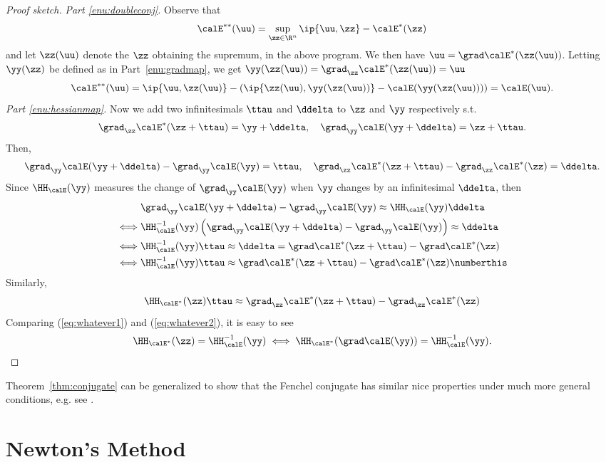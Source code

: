 \begin{proof}[Proof sketch]
\emph{Part \ref{enu:doubleconj}.}
  Observe that
  \[ \calE^{**}(\uu) = \sup_{\zz \in \R^n} \ip{\uu,\zz} - \calE^*(\zz) \]
  and let $\zz(\uu)$ denote the $\zz$ obtaining the supremum, in the
  above program.
  We then have ${\uu =\grad\calE^*(\zz(\uu))}$. Letting $\yy(\zz)$ be
  defined as in Part~\ref{enu:gradmap},
  we get $\yy(\zz(\uu)) = \grad_{\zz}\calE^*(\zz(\uu)) = \uu$
  \[
    \calE^{**}(\uu) = \ip{\uu,\zz(\uu)} - \left(
      \ip{\zz(\uu),\yy(\zz(\uu))}-\calE(\yy(\zz(\uu))) \right)
    = \calE(\uu)
  .
  \]
  \emph{Part \ref{enu:hessianmap}.}
  Now we add two infinitesimals $\ttau$ and $\ddelta$ to $\zz$ and $\yy$ respectively s.t.
  \[ \grad_{\zz}\calE^*(\zz+\ttau)=\yy+\ddelta, \quad \grad_{\yy}\calE(\yy+\ddelta) = \zz+\ttau. \]
  Then,
  \[ \grad_{\yy}\calE(\yy+\ddelta) - \grad_{\yy}\calE(\yy) = \ttau, \quad
  \grad_{\zz}\calE^*(\zz+\ttau) - \grad_{\zz}\calE^*(\zz) = \ddelta. \]
  Since $\HH_{\calE}(\yy)$ measures the change of $\grad_{\yy}\calE(\yy)$ when $\yy$ changes by an infinitesimal $\ddelta$, then
  \begin{align*}
    & \grad_{\yy}\calE(\yy+\ddelta) - \grad_{\yy}\calE(\yy) \approx \HH_{\calE}(\yy)\ddelta \\
    \iff & \HH_{\calE}^{-1}(\yy)\left( \grad_{\yy}\calE(\yy+\ddelta) - \grad_{\yy}\calE(\yy) \right) \approx \ddelta \\
    \iff & \HH_{\calE}^{-1}(\yy)\ttau \approx \ddelta = \grad\calE^*(\zz+\ttau) - \grad\calE^*(\zz) \\
    \iff & \HH_{\calE}^{-1}(\yy)\ttau \approx \grad\calE^*(\zz+\ttau) - \grad\calE^*(\zz) \numberthis \label{eq:whatever1}
  \end{align*}
  Similarly,
  \begin{equation}\label{eq:whatever2}
    \HH_{\calE^*}(\zz)\ttau \approx
    \grad_{\zz}\calE^*(\zz+\ttau) - \grad_{\zz}\calE^*(\zz)
  \end{equation}
  Comparing (\ref{eq:whatever1}) and (\ref{eq:whatever2}), it is easy to see
  \[ \HH_{\calE^*}(\zz) = \HH_{\calE}^{-1}(\yy) \iff \HH_{\calE^*}(\grad\calE(\yy)) = \HH_{\calE}^{-1}(\yy). \]
\end{proof}

\begin{remark}
  Theorem~\ref{thm:conjugate} can be generalized to show that the
  Fenchel conjugate has similar nice properties under much more
  general conditions,
  e.g. see \cite{BV04}.
\end{remark}

\section{Newton's Method}
